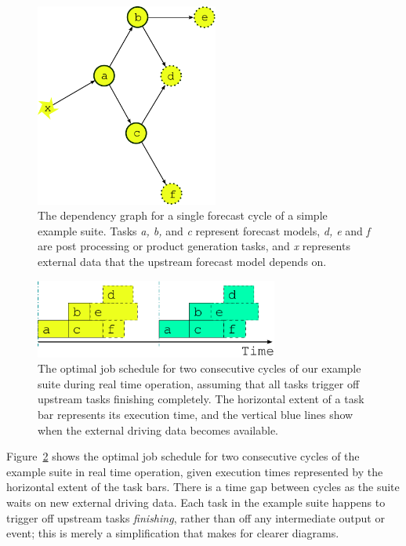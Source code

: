 \documentclass[11pt,a4paper]{article}
\begin{document}
\begin{figure}
    \begin{center}
        \includegraphics[width=6cm]{inkscape-svg/dep-one-cycle} 
    \end{center}
    \caption[Single cycle dependency graph for a simple suite]{\small
    The dependency graph for a single forecast cycle of a simple example
    suite. Tasks {\em a, b,} and {\em c} represent forecast models,
    {\em d, e} and {\em f} are post processing or product generation
    tasks, and {\em x} represents external data that the upstream
    forecast model depends on.}
    \label{fig-dep-one} 
\end{figure} 

\begin{figure}
    \begin{center}
        \includegraphics[width=8cm]{inkscape-svg/timeline-one}
    \end{center}
    \caption[Single cycle job schedules for real time operation]{\small
    The optimal job schedule for two consecutive cycles of our example
    suite during real time operation, assuming that all tasks trigger 
    off upstream tasks finishing completely. The horizontal extent of
    a task bar represents its execution time, and the vertical blue
    lines show when the external driving data becomes available.}
    \label{fig-time-one}
\end{figure}

Figure~\ref{fig-time-one} shows the optimal job schedule for two
consecutive cycles of the example suite in real time operation, given
execution times represented by the horizontal extent of the task bars.
There is a time gap between cycles as the suite waits on new external
driving data.  Each task in the example suite happens to trigger off
upstream tasks {\em finishing}, rather than off any intermediate output
or event; this is merely a simplification that makes for clearer diagrams.
\end{document}
